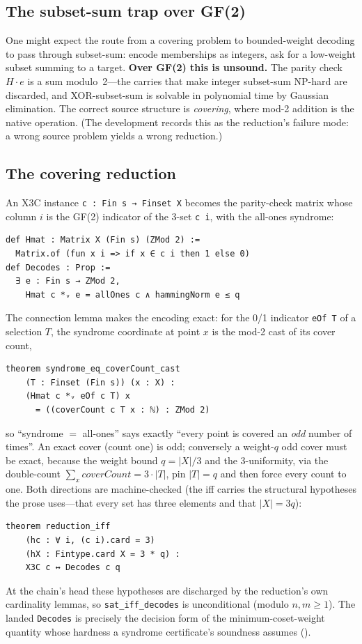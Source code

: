 \documentclass[sigplan,review,anonymous]{acmart}
\begin{document}
\subsection{The subset-sum trap over GF(2)}\label{sec:trap}

One might expect the route from a covering problem to bounded-weight decoding to pass through subset-sum:
encode memberships as integers, ask for a low-weight subset summing to a target. \textbf{Over GF(2) this is
unsound.} The parity check $H \cdot e$ is a sum modulo~2---the carries that make integer subset-sum NP-hard are
discarded, and XOR-subset-sum is solvable in polynomial time by Gaussian elimination. The correct source
structure is \emph{covering}, where mod-2 addition is the native operation. (The development records this as the
reduction's failure mode: a wrong source problem yields a wrong reduction.)

\subsection{The covering reduction}\label{sec:covering}

An X3C instance \lstinline{c : Fin s → Finset X} becomes the parity-check matrix whose column $i$ is the GF(2)
indicator of the 3-set \lstinline{c i}, with the all-ones syndrome:
\begin{lstlisting}[style=leandisplay]
def Hmat : Matrix X (Fin s) (ZMod 2) :=
  Matrix.of (fun x i => if x ∈ c i then 1 else 0)
def Decodes : Prop :=
  ∃ e : Fin s → ZMod 2,
    Hmat c *ᵥ e = allOnes c ∧ hammingNorm e ≤ q
\end{lstlisting}
The connection lemma makes the encoding exact: for the 0/1 indicator \lstinline{eOf T} of a selection $T$, the
syndrome coordinate at point $x$ is the mod-2 cast of its cover count,
\begin{lstlisting}[style=leandisplay]
theorem syndrome_eq_coverCount_cast
    (T : Finset (Fin s)) (x : X) :
    (Hmat c *ᵥ eOf c T) x
      = ((coverCount c T x : ℕ) : ZMod 2)
\end{lstlisting}
so ``syndrome $=$ all-ones'' says exactly ``every point is covered an \emph{odd} number of times''. An exact
cover (count one) is odd; conversely a weight-$q$ odd cover must be exact, because the weight bound
$q = |X|/3$ and the 3-uniformity, via the double-count $\sum_x \mathit{coverCount} = 3 \cdot |T|$, pin
$|T| = q$ and then force every count to one. Both directions are machine-checked (the iff carries the
structural hypotheses the prose uses---that every set has three elements and that $|X| = 3q$):
\begin{lstlisting}[style=leandisplay]
theorem reduction_iff
    (hc : ∀ i, (c i).card = 3)
    (hX : Fintype.card X = 3 * q) :
    X3C c ↔ Decodes c q
\end{lstlisting}
At the chain's head these hypotheses are discharged by the reduction's own cardinality lemmas, so
\lstinline{sat_iff_decodes} is unconditional (modulo $n, m \ge 1$). The landed \lstinline{Decodes} is precisely
the decision form of the minimum-coset-weight quantity whose hardness a syndrome certificate's soundness
assumes ().
\end{document}

